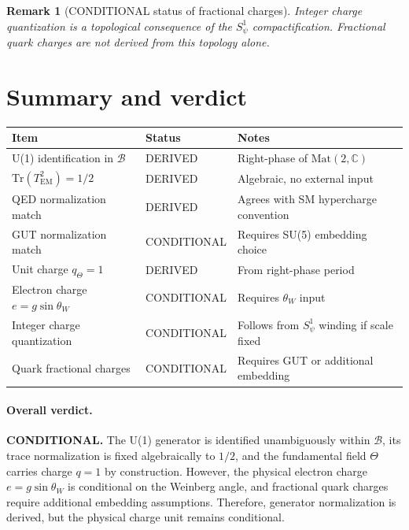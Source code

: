 \documentclass[11pt,a4paper]{article}
\newtheorem{remark}[proposition]{Remark}
\begin{document}
\begin{remark}[CONDITIONAL status of fractional charges]
Integer charge quantization is a topological consequence of the
$S^1_\psi$ compactification.  Fractional quark charges are not derived
from this topology alone.
\end{remark}

\section{Summary and verdict}

\begin{center}
\begin{tabular}{@{}lll@{}}
\toprule
Item & Status & Notes \\
\midrule
U(1) identification in $\mathcal{B}$ & DERIVED & Right-phase of $\mathrm{Mat}(2,\mathbb{C})$ \\
$\mathrm{Tr}(T_{\mathrm{EM}}^2)=1/2$ & DERIVED & Algebraic, no external input \\
QED normalization match & DERIVED & Agrees with SM hypercharge convention \\
GUT normalization match & CONDITIONAL & Requires SU(5) embedding choice \\
Unit charge $q_\Theta=1$ & DERIVED & From right-phase period \\
Electron charge $e=g\sin\theta_W$ & CONDITIONAL & Requires $\theta_W$ input \\
Integer charge quantization & CONDITIONAL & Follows from $S^1_\psi$ winding if scale fixed \\
Quark fractional charges & CONDITIONAL & Requires GUT or additional embedding \\
\bottomrule
\end{tabular}
\end{center}

\paragraph{Overall verdict.}
\textbf{CONDITIONAL.}
The U(1) generator is identified unambiguously within $\mathcal{B}$, its trace
normalization is fixed algebraically to $1/2$, and the fundamental field
$\Theta$ carries charge $q=1$ by construction.  However, the physical electron
charge $e=g\sin\theta_W$ is conditional on the Weinberg angle, and fractional
quark charges require additional embedding assumptions.  Therefore, generator
normalization is derived, but the physical charge unit remains conditional.
\end{document}
